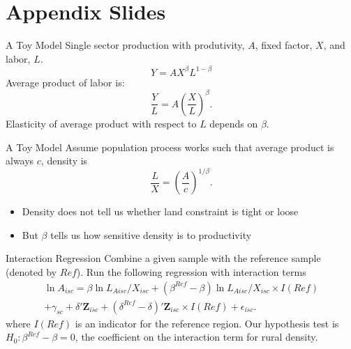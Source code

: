 \documentclass[10pt, xcolor=dvipsnames]{beamer}
\begin{document}
\section{Appendix Slides}

\begin{frame}{A Toy Model}\label{toy}
Single sector production with produtivity, $A$, fixed factor, $X$, and labor, $L$. 
\begin{equation}
Y = A X^\beta L^{1-\beta}
\end{equation}
Average product of labor is:
\begin{equation}
    \frac{Y}{L} = A \left(\frac{X}{L}\right)^{\beta}.
\end{equation}
Elasticity of average product with respect to $L$ depends on $\beta$.
\end{frame}

\begin{frame}{A Toy Model}
Assume population process works such that average product is always $c$, density is
\begin{equation}
    \frac{L}{X} = \left(\frac{A}{c}\right)^{1/\beta}.
\end{equation}

\begin{itemize}
  \item Density does not tell us whether land constraint is tight or loose 
  \item But $\beta$ tells us how sensitive density is to productivity
\end{itemize}
\hfill \hyperlink{define}{}
\end{frame}

\begin{frame}{Interaction Regression}\label{interaction}
Combine a given sample with the reference sample (denoted by $Ref$). Run the following regression with interaction terms
\begin{eqnarray}
    \ln A_{isc} = \beta \ln L_{Aisc}/X_{isc} + (\beta^{Ref} - \beta) \ln L_{Aisc}/X_{isc} \times I(Ref) \\ \nonumber
    + \gamma_{sc} + \delta' \mathbf{Z}_{isc} + (\delta^{Ref} - \delta)'\mathbf{Z}_{isc} \times I(Ref) + \epsilon_{isc}. \label{EQ_interaction}
\end{eqnarray}
where $I(Ref)$ is an indicator for the reference region. Our hypothesis test is $H_0: \beta^{Ref} - \beta = 0$, the coefficient on the interaction term for rural density. 

\hfill \hyperlink{testing}{}
\end{frame}
\end{document}
